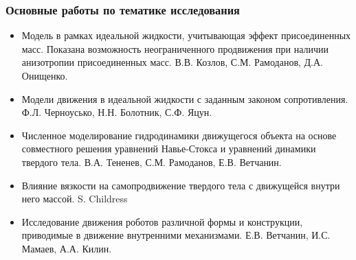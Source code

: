 \begin{frame}
\frametitle{Основные работы по тематике исследования}
	
	\begin{itemize}
		\item Модель в рамках идеальной жидкости, учитывающая эффект присоединенных масс. Показана возможность неограниченного продвижения при наличии анизотропии присоединенных масс. В.В. Козлов, С.М. Рамоданов, Д.А. Онищенко.
	\end{itemize}

		\begin{minipage}[t]{0.6\linewidth}
			\vspace{-13mm}
			\begin{itemize}
				\item Модели движения в идеальной жидкости с заданным законом сопротивления. Ф.Л. Черноусько, Н.Н. Болотник, С.Ф. Яцун.
			\end{itemize}
		\end{minipage}
		\hfill
		\begin{minipage}[t]{0.30\linewidth}
		\end{minipage}	
	
	\begin{itemize}
		\item Численное моделирование гидродинамики движущегося объекта на основе совместного решения уравнений Навье-Стокса и уравнений динамики твердого тела. В.А. Тененев, С.М. Рамоданов, Е.В. Ветчанин.
		
		\item Влияние вязкости на самопродвижение твердого тела с движущейся внутри него массой. S. Childress
		
		\item Исследование движения роботов различной формы и конструкции, приводимые в движение внутренними механизмами. Е.В. Ветчанин, И.С. Мамаев, А.А. Килин.
		
		
	\end{itemize}

\end{frame}

